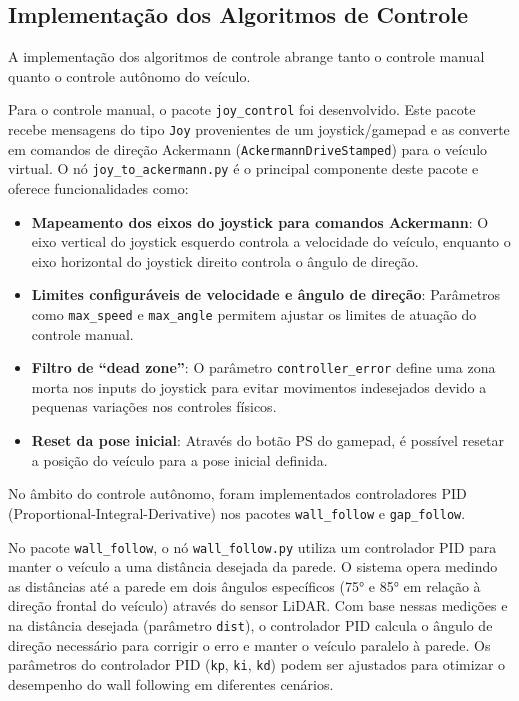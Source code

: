 \subsection{Implementação dos Algoritmos de Controle}

A implementação dos algoritmos de controle abrange tanto o controle manual
quanto o controle autônomo do veículo.

Para o controle manual, o pacote \texttt{joy\_control} foi desenvolvido. Este
pacote recebe mensagens do tipo \texttt{Joy} provenientes de um
joystick/gamepad e as converte em comandos de direção Ackermann
(\texttt{AckermannDriveStamped}) para o veículo virtual. O nó
\texttt{joy\_to\_ackermann.py} é o principal componente deste pacote e oferece
funcionalidades como:

\begin{itemize}
    \item \textbf{Mapeamento dos eixos do joystick para comandos Ackermann}: O eixo vertical do
          joystick esquerdo controla a velocidade do veículo, enquanto o eixo horizontal do
          joystick direito controla o ângulo de direção.

    \item \textbf{Limites configuráveis de velocidade e ângulo de direção}: Parâmetros como
          \texttt{max\_speed} e \texttt{max\_angle} permitem ajustar os limites de atuação
          do controle manual.

    \item \textbf{Filtro de ``dead zone''}: O parâmetro \texttt{controller\_error} define uma
          zona morta nos inputs do joystick para evitar movimentos indesejados devido a pequenas
          variações nos controles físicos.

    \item \textbf{Reset da pose inicial}: Através do botão PS do gamepad, é possível resetar
          a posição do veículo para a pose inicial definida.
\end{itemize}

No âmbito do controle autônomo, foram implementados controladores PID
(Proportional-Integral-Derivative) nos pacotes \texttt{wall\_follow} e
\texttt{gap\_follow}.

No pacote \texttt{wall\_follow}, o nó \texttt{wall\_follow.py} utiliza um
controlador PID para manter o veículo a uma distância desejada da parede. O
sistema opera medindo as distâncias até a parede em dois ângulos específicos
(75° e 85° em relação à direção frontal do veículo) através do sensor LiDAR.
Com base nessas medições e na distância desejada (parâmetro \texttt{dist}), o
controlador PID calcula o ângulo de direção necessário para corrigir o erro e
manter o veículo paralelo à parede. Os parâmetros do controlador PID
(\texttt{kp}, \texttt{ki}, \texttt{kd}) podem ser ajustados para otimizar o
desempenho do wall following em diferentes cenários.

